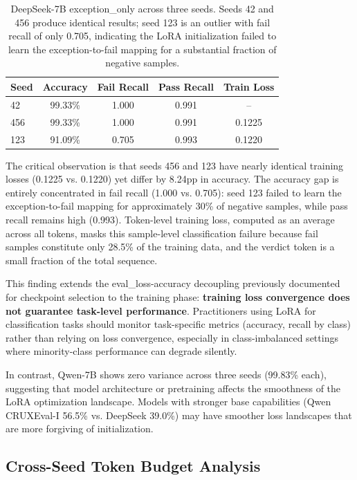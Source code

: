 \documentclass[11pt]{article}
\begin{document}
\begin{table}[t]
\centering
\caption{DeepSeek-7B exception\_only across three seeds. Seeds 42 and 456 produce identical results; seed 123 is an outlier with fail recall of only 0.705, indicating the LoRA initialization failed to learn the exception-to-fail mapping for a substantial fraction of negative samples.}
\label{tab:seed_deepseek}
\begin{tabular}{lcccc}
\toprule
Seed & Accuracy & Fail Recall & Pass Recall & Train Loss \\
\midrule
42 & 99.33\% & 1.000 & 0.991 & -- \\
456 & 99.33\% & 1.000 & 0.991 & 0.1225 \\
123 & 91.09\% & 0.705 & 0.993 & 0.1220 \\
\bottomrule
\end{tabular}
\end{table}

The critical observation is that seeds 456 and 123 have nearly identical training losses (0.1225 vs. 0.1220) yet differ by 8.24pp in accuracy. The accuracy gap is entirely concentrated in fail recall (1.000 vs. 0.705): seed 123 failed to learn the exception-to-fail mapping for approximately 30\% of negative samples, while pass recall remains high (0.993). Token-level training loss, computed as an average across all tokens, masks this sample-level classification failure because fail samples constitute only 28.5\% of the training data, and the verdict token is a small fraction of the total sequence.

This finding extends the eval\_loss-accuracy decoupling previously documented for checkpoint selection \citep{ni2024dcsh} to the training phase: \textbf{training loss convergence does not guarantee task-level performance}. Practitioners using LoRA for classification tasks should monitor task-specific metrics (accuracy, recall by class) rather than relying on loss convergence, especially in class-imbalanced settings where minority-class performance can degrade silently.

In contrast, Qwen-7B shows zero variance across three seeds (99.83\% each), suggesting that model architecture or pretraining affects the smoothness of the LoRA optimization landscape. Models with stronger base capabilities (Qwen CRUXEval-I 56.5\% vs. DeepSeek 39.0\%) may have smoother loss landscapes that are more forgiving of initialization.

\subsection{Cross-Seed Token Budget Analysis}
\label{sec:budget}
\end{document}
